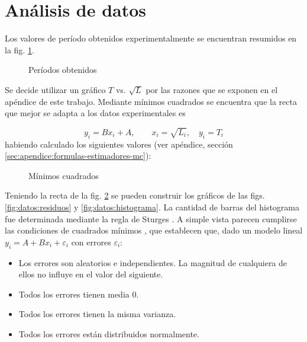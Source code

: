 \section{Análisis de datos}


Los valores de período obtenidos experimentalmente se encuentran resumidos en
la fig. \ref{fig:datos:periodos}.

\begin{figure}[H]
    \centering
    
    \caption{Períodos obtenidos}
    \label{fig:datos:periodos}
\end{figure}

Se decide utilizar un gráfico $T$ vs. $\sqrt{L}$ por las razones que se 
exponen en el apéndice de este trabajo. Mediante mínimos cuadrados se encuentra
que la recta que mejor se adapta a los datos experimentales es

\[
    y_i = Bx_i + A, \quad\quad x_i = \sqrt{L_i}, \quad y_i = T_i
\]
habiendo calculado los siguientes valores (ver apéndice, sección 
\ref{sec:apendice:formulas-estimadores-mc}):

\begin{itemize}
    
\end{itemize}


\begin{figure}[H]
    \centering
    
    \caption{Mínimos cuadrados}
    \label{fig:datos:regresion}
\end{figure}

Teniendo la recta de la fig. \ref{fig:datos:regresion} se pueden construir los
gráficos de las figs. \ref{fig:datos:residuos} y \ref{fig:datos:histograma}.
La cantidad de barras del histograma fue determinada mediante la regla de 
Sturges \cite{sturges}.
A simple vista parecen cumplirse las condiciones de cuadrados mínimos 
\cite[pág. 527]{estadistica}, que establecen que, dado un modelo lineal
$y_i = A + Bx_i + \varepsilon_i$ con errores $\varepsilon_i$:

\begin{itemize}
    \item Los errores son aleatorios e independientes. La magnitud de 
        cualquiera de ellos no influye en el valor del siguiente.
    \item Todos los errores tienen media 0.
    \item Todos los errores tienen la misma varianza.
    \item Todos los errores están distribuidos normalmente.
\end{itemize}

